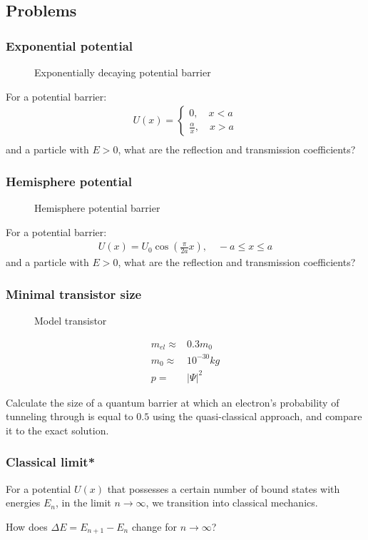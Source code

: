 	\subsection{Problems}
		\subsubsection{Exponential potential}
			\begin{figure}[!h]
				\centering
				
				\caption{Exponentially decaying potential barrier}
			\end{figure}
			For a potential barrier:
			\begin{align}
				U(x) = \left\{ \begin{aligned}
					0,\quad x < a \\
					\frac{\alpha}{x},\quad x > a
				\end{aligned}
				\right. \\
			\end{align}
			and a particle with $E > 0$, what are the reflection and transmission coefficients?
			
		\subsubsection{Hemisphere potential}
			\begin{figure}[!h]
				\centering
				
				\caption{Hemisphere potential barrier}
			\end{figure}
			For a potential barrier:
			\begin{align}
				U(x) = U_0 \cos(\frac{\pi}{2a}x), \quad -a \leq x \leq a
			\end{align}
			and a particle with $E > 0$, what are the reflection and transmission coefficients?
		\subsubsection{Minimal transistor size}
			\begin{figure}[!h]
				\centering
				
				\caption{Model transistor}
			\end{figure}
			
			\begin{align}
				m_{el} \approx& 0.3 m_0 \\
				m_0 \approx& 10^{-30}\si{kg} \\
				p =& |\Psi|^2
			\end{align}			
			
			Calculate the size of a quantum barrier at which an electron's probability of tunneling through is equal to $0.5$ using the quasi-classical approach, and compare it to the exact solution.
		
		\subsubsection{Classical limit*}	
			For a potential $U(x)$ that possesses a certain number of bound states with energies $E_n$, in the limit $n\rightarrow\infty$, we transition into classical mechanics. 
			
			How does $\Delta E = E_{n+1}-E_n$ change for $n\rightarrow\infty$?
